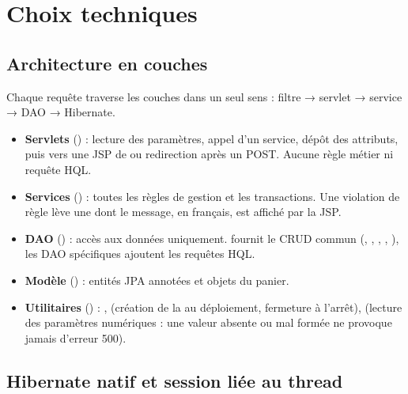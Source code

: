 \chapter{Choix techniques}

\section{Architecture en couches}

Chaque requête traverse les couches dans un seul sens : filtre → servlet → service → DAO → Hibernate.

\begin{itemize}
  \item \textbf{Servlets} () : lecture des paramètres, appel d'un service, dépôt des attributs, puis
         vers une JSP de  ou redirection après un POST. Aucune règle métier ni requête HQL.
  \item \textbf{Services} () : toutes les règles de gestion et les transactions. Une violation de règle lève
        une  dont le message, en français, est affiché par la JSP.
  \item \textbf{DAO} () : accès aux données uniquement.  fournit le CRUD commun (,
        , , , ), les DAO spécifiques ajoutent les requêtes HQL.
  \item \textbf{Modèle} () : entités JPA annotées et objets du panier.
  \item \textbf{Utilitaires} () : ,  (création de la  au
        déploiement, fermeture à l'arrêt),  (lecture des paramètres numériques : une valeur absente ou
        mal formée ne provoque jamais d'erreur 500).
\end{itemize}

\section{Hibernate natif et session liée au thread}

